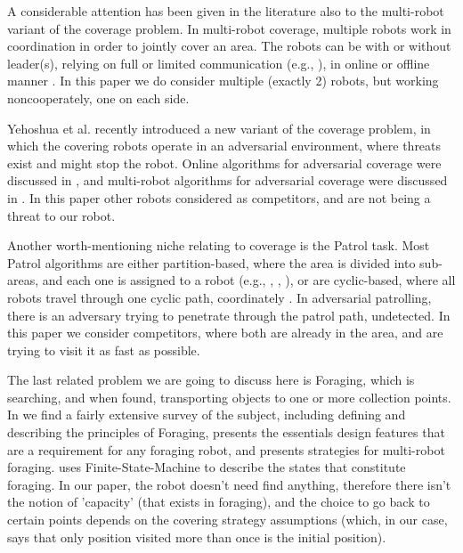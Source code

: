 \documentclass[a4paper,10pt]{article}
\begin{document}
A considerable attention has been given in the literature also to the multi-robot variant of the coverage problem. In multi-robot coverage, multiple robots work in coordination in order to jointly cover an area. The robots can be with or without leader(s), relying on full or limited communication (e.g., \cite{agmon2008giving}), in online or offline manner \cite{agmon2008giving, de2005blind}.
In this paper we do consider multiple (exactly 2) robots, but working noncooperately, one on each side.

Yehoshua et al. \cite{yehoshua2013robotic} recently introduced a new variant of the coverage problem, in which the covering robots operate in an adversarial environment, where threats exist and might stop the robot. Online algorithms for adversarial coverage were discussed in  \cite{yehoshua2015online}, and multi-robot algorithms for adversarial coverage were discussed in \cite{yehoshua2016multi}.
In this paper other robots considered as competitors, and are not being a threat to our robot. %

Another worth-mentioning niche relating to coverage is the Patrol task. %
Most Patrol algorithms are either partition-based, where the area is divided into sub-areas, and each one is assigned to a robot (e.g., \cite{guo2004towards}, \cite{guo2004coverage}, \cite{jung2002tracking}), or are cyclic-based, where all robots travel through one cyclic path, coordinately \cite{chevaleyre2004theoretical}. 
In adversarial patrolling, there is an adversary trying to penetrate through the patrol path, undetected. In this paper we consider competitors, where both are already in the area, and are trying to visit it as fast as possible. %

The last related problem we are going to discuss here is Foraging, which is searching, and when found, transporting objects to one or more collection points. In \cite{winfield2009foraging} we find a fairly extensive survey of the subject, including defining and describing the principles of Foraging, presents the essentials design features that are a requirement for any foraging robot, and presents strategies for multi-robot foraging. \cite{winfield2009foraging} uses Finite-State-Machine to describe the states that constitute foraging. In our paper, the robot doesn't need find anything, therefore there isn't the notion of 'capacity' (that exists in foraging), and the choice to go back to certain points depends on the covering strategy assumptions (which, in our case, says that only position visited more than once is the initial position).
\end{document}
